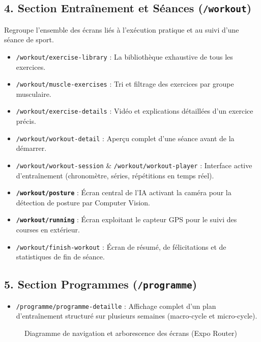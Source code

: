 \subsection{4. Section Entraînement et Séances (\texttt{/workout})}
Regroupe l'ensemble des écrans liés à l'exécution pratique et au suivi d'une séance de sport.
\begin{itemize}
    \item \texttt{/workout/exercise-library} : La bibliothèque exhaustive de tous les exercices.
    \item \texttt{/workout/muscle-exercises} : Tri et filtrage des exercices par groupe musculaire.
    \item \texttt{/workout/exercise-details} : Vidéo et explications détaillées d'un exercice précis.
    \item \texttt{/workout/workout-detail} : Aperçu complet d'une séance avant de la démarrer.
    \item \texttt{/workout/workout-session} \& \texttt{/workout/workout-player} : Interface active d'entraînement (chronomètre, séries, répétitions en temps réel).
    \item \textbf{\texttt{/workout/posture}} : Écran central de l'IA activant la caméra pour la détection de posture par Computer Vision.
    \item \textbf{\texttt{/workout/running}} : Écran exploitant le capteur GPS pour le suivi des courses en extérieur.
    \item \texttt{/workout/finish-workout} : Écran de résumé, de félicitations et de statistiques de fin de séance.
\end{itemize}

\subsection{5. Section Programmes (\texttt{/programme})}
\begin{itemize}
    \item \texttt{/programme/programme-detaille} : Affichage complet d'un plan d'entraînement structuré sur plusieurs semaines (macro-cycle et micro-cycle).
\end{itemize}

\begin{figure}[H]
    \centering
\caption{Diagramme de navigation et arborescence des écrans (Expo Router)}
\end{figure}
